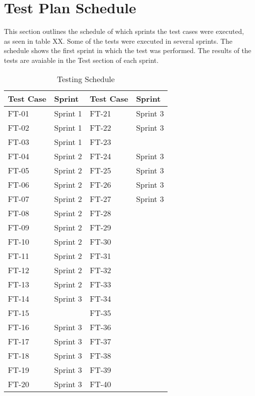 \section{Test Plan Schedule}

This section outlines the schedule of which sprints the test cases were executed, as seen in table XX. Some of the tests were executed in several sprints. The schedule shows the first sprint in which the test was performed. The results of the tests are avaiable in the Test section of each sprint.


\begin{table}[h]
\centering
\begin{tabular}{| l | l || l | l |}
	\rowcolor{lightgray}
	\hline
	{\bf Test Case} & {\bf Sprint} & {\bf Test Case} & {\bf Sprint} \\ \hline
	FT-01 & Sprint 1 & FT-21 & Sprint 3 \\ \hline
	FT-02 & Sprint 1 & FT-22 & Sprint 3 \\ \hline
	FT-03 & Sprint 1 & FT-23 & \\ \hline
	FT-04 & Sprint 2 & FT-24 & Sprint 3 \\ \hline
	FT-05 & Sprint 2 & FT-25 & Sprint 3 \\ \hline
	FT-06 & Sprint 2 & FT-26 & Sprint 3 \\ \hline
	FT-07 & Sprint 2 & FT-27 & Sprint 3 \\ \hline
	FT-08 & Sprint 2 & FT-28 & \\ \hline
	FT-09 & Sprint 2 & FT-29 & \\ \hline
	FT-10 & Sprint 2 & FT-30 & \\ \hline
	FT-11 & Sprint 2 & FT-31 & \\ \hline
	FT-12 & Sprint 2 & FT-32 & \\ \hline 
	FT-13 & Sprint 2 & FT-33 & \\ \hline
	FT-14 & Sprint 3 & FT-34 & \\ \hline
	FT-15 & 		 & FT-35 & \\ \hline
	FT-16 & Sprint 3 & FT-36 & \\ \hline
	FT-17 & Sprint 3 & FT-37 & \\ \hline
	FT-18 & Sprint 3 & FT-38 & \\ \hline
	FT-19 & Sprint 3 & FT-39 & \\ \hline
	FT-20 & Sprint 3 & FT-40 & \\ \hline
\end{tabular}
\caption{Testing Schedule}
\end{table}